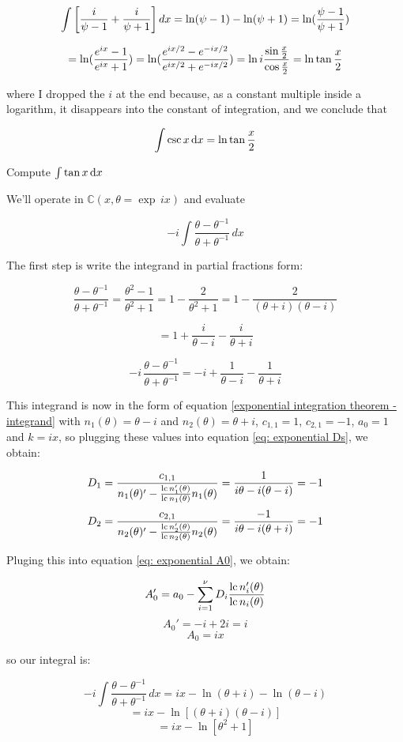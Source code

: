 $$\int \left[ {{i}\over{\psi-1}} + {{i}\over{\psi+1}} \right] dx
= \ln (\psi-1) - \ln(\psi+1) = \ln({{\psi-1}\over{\psi+1}})$$

$$ = \ln ({{e^{ix}-1}\over{e^{ix}+1}}) = \ln ({{e^{ix/2}-e^{-ix/2}}\over{e^{ix/2}+e^{-ix/2}}}) = \ln i {{\sin {x\over2}}\over{\cos {x\over2}}} = \ln \tan {x\over2} $$

where I dropped the $i$ at the end because, as a constant multiple
inside a logarithm, it disappears into the constant of integration,
and we conclude that

$$\int \csc x \,{\rm d}x = \ln \tan {x\over2} $$

\endexample

\vfil\eject

\example Compute $\int \tan x \, {\rm d}x$

We'll operate in ${\mathbb C}(x, \theta = \exp \,ix)$ and evaluate

$$-i \int \frac{\theta - \theta^{-1}}{\theta + \theta^{-1}} \,dx$$

The first step is write the integrand in partial fractions form:

$$\frac{\theta - \theta^{-1}}{\theta + \theta^{-1}} = \frac{\theta^2 - 1}{\theta^2 + 1}
= 1 - \frac{2}{\theta^2 + 1}
= 1 - \frac{2}{(\theta + i)(\theta - i)} $$

$$ = 1 + \frac{i}{\theta - i} - \frac{i}{\theta + i} $$

$$-i\, \frac{\theta - \theta^{-1}}{\theta + \theta^{-1}} = -i + \frac{1}{\theta - i} - \frac{1}{\theta + i} $$

This integrand is now in the form of equation
\eqref{exponential integration theorem - integrand} with
$n_1(\theta) = \theta -i$ and $n_2(\theta) = \theta + i$, $c_{1,1} = 1$,
$c_{2,1}=-1$, $a_0 = 1$ and $k=ix$, so plugging these values
into equation \eqref{eq: exponential Ds}, we obtain:


$$ D_1 = \frac{c_{1,1}}{n_1(\theta)' - \frac{{\rm lc\,} n_1'(\theta)}{{\rm lc\,} n_1(\theta)} n_1(\theta)} = \frac{1}{i \theta - i (\theta -i )} = -1$$
$$ D_2 = \frac{c_{2,1}}{n_2(\theta)' - \frac{{\rm lc\,} n_2'(\theta)}{{\rm lc\,} n_2(\theta)} n_2(\theta)} = \frac{-1}{i \theta - i (\theta +i )} = -1$$

Pluging this into equation \eqref{eq: exponential A0}, we obtain:

$$A_0' = a_0 - \sum_{i=1}^\nu D_i \frac{{\rm lc\,} n_i'(\theta)}{{\rm lc\,} n_i(\theta)}$$
$$A_0' = -i + 2i = i$$
$$A_0 = ix$$

so our integral is:

$$-i \int \frac{\theta - \theta^{-1}}{\theta + \theta^{-1}} \,dx
  = ix - \ln (\theta+i) - \ln(\theta-i)$$
$$  = ix - \ln \left[ (\theta+i)(\theta-i) \right]$$
$$  = ix - \ln \left[ \theta^2 + 1 \right]$$

